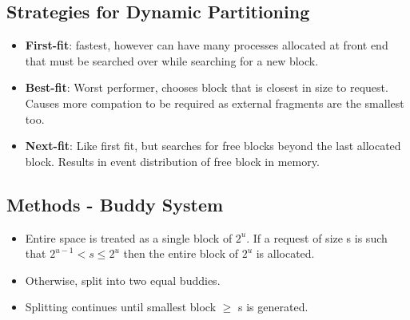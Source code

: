 \documentclass[fontsize=5pt]{scrartcl}
\begin{document}
\begin{multicols}{3}
        \subsection{Strategies for Dynamic Partitioning}
        \begin{itemize}
          \item \textbf{First-fit}: fastest, however can have many processes allocated at front end that must be searched over
                while searching for a new block.
          \item \textbf{Best-fit}: Worst performer, chooses block that is closest in size to request. Causes more compation to be
                required as external fragments are the smallest too.
          \item \textbf{Next-fit}: Like first fit, but searches for free blocks beyond the last allocated block. Results in event distribution of free block
                in memory.
        \end{itemize}
        \subsection{Methods - Buddy System}
        \begin{itemize}
          \item Entire space is treated as a single block of $2^{u}$. If a request of size s is such that $2^{u-1}<s\leq2^{u}$ then
          the entire block of $2^{u}$ is allocated.
          \item Otherwise, split into two equal buddies.
          \item Splitting continues until smallest block $\geq$ s is generated.
         \end{itemize}
    

\end{multicols}
\end{document}
